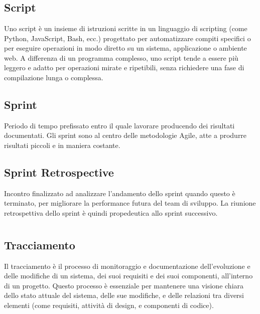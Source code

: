 
\section{}

\subsection*{Script}
Uno script è un insieme di istruzioni scritte in un linguaggio di scripting (come Python, JavaScript, Bash, ecc.) progettato per automatizzare compiti 
specifici o per eseguire operazioni in modo diretto su un sistema, applicazione o ambiente web. A differenza di un programma complesso, uno script tende 
a essere più leggero e adatto per operazioni mirate e ripetibili, senza richiedere una fase di compilazione lunga o complessa.

\subsection*{Sprint}
Periodo di tempo prefissato entro il quale lavorare producendo dei risultati documentati. Gli sprint sono al centro delle metodologie Agile, atte a produrre 
risultati piccoli e in maniera costante.

\subsection*{Sprint Retrospective}
Incontro finalizzato ad analizzare l’andamento dello sprint quando questo è terminato, per migliorare la performance futura del team di sviluppo. La 
riunione retrospettiva dello sprint è quindi propedeutica allo sprint successivo.

\newpage



\section{}

\subsection*{Tracciamento}
Il tracciamento è il processo di monitoraggio e documentazione dell'evoluzione e delle modifiche di un sistema, dei suoi requisiti e dei suoi componenti, 
all’interno di un progetto. Questo processo è essenziale per mantenere una visione chiara dello stato attuale del sistema, delle sue modifiche, e delle 
relazioni tra diversi elementi (come requisiti, attività di design, e componenti di codice).

